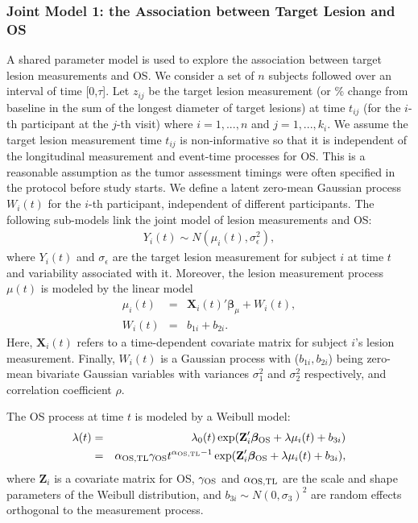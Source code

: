 \documentclass[aoas]{imsart}
\theoremstyle{plain}
\theoremstyle{remark}
\begin{document}
\subsubsection{Joint Model 1: the Association between Target Lesion and OS} \label{sec:TL}

A shared parameter model is used to explore the association between target lesion measurements and OS. We consider a set of $n$ subjects followed over an interval of time [0,$\tau$]. Let $z_{ij}$ be the target lesion measurement (or \% change from baseline in the sum of the longest diameter of target lesions) at time $t_{ij}$ (for the $i$-th participant at the $j$-th visit) where $i=1,...,n$ and $j=1,...,k_i$. We assume the target lesion measurement time $t_{ij}$ is non-informative so that it is independent of the longitudinal measurement and event-time processes for OS. This is a reasonable assumption as the tumor assessment timings were often specified in the protocol before study starts. We define a latent zero-mean Gaussian process $W_i(t)$ for the $i$-th participant, independent of different participants. The following sub-models link the joint model of lesion measurements and OS:
\begin{eqnarray*}
Y_{i}(t) \sim N(\mu_{i}(t), \sigma^{2}_{\epsilon}),
\end{eqnarray*}
where $Y_{i}(t)$ and $\sigma_{\epsilon}$ are the target lesion measurement for subject $i$ at time $t$ and variability associated with it. Moreover, the lesion measurement process $\mu(t)$ is modeled by the linear model
\begin{eqnarray*}
\mu_{i}(t) &=& \textbf{X}_i(t)' \boldsymbol{\beta}_{\mu}+W_{i}(t), \\
W_{i}(t) &=& b_{1i}+b_{2i}.
\end{eqnarray*}
Here, $\textbf{X}_i(t)$ refers to a time-dependent covariate matrix for subject $i$'s lesion measurement. Finally, $W_i(t)$ is a Gaussian process with ($b_{1i},b_{2i}$) being zero-mean bivariate Gaussian variables with variances $\sigma_1^2$ and $\sigma_2^2$ respectively, and correlation coefficient $\rho$. 

The OS process at time $t$ is modeled by a Weibull model:
\begin{eqnarray*}
\lambda(t) &=& \lambda_0(t) \exp(\textbf{Z}_i' \boldsymbol{\beta}_{\rm OS}+\lambda \mu_{i}(t)+b_{3i})\\
 &=& \alpha_{\rm OS,TL} \gamma_{\rm OS} t^{\alpha_{\rm OS,TL}-1} \exp(\textbf{Z}_i' \boldsymbol{\beta}_{\rm OS}+\lambda \mu_{i}(t)+b_{3i}),
\end{eqnarray*}
where $\textbf{Z}_i$ is a covariate matrix for OS, $\gamma_{\rm OS}$ and $\alpha_{\rm OS,TL}$ are the scale and shape parameters
of the Weibull distribution, and $b_{3i}\sim N(0,{\sigma_3})^2$ are random effects orthogonal to the measurement process. 
\end{document}
